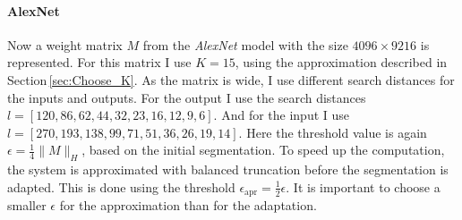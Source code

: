 \documentclass[numbers=noenddot,doctype=mastersthesis,BCOR=15mm,biblatex]{ldvbook}%
\begin{document}
\paragraph{AlexNet}
Now a weight matrix $M$ from the \emph{AlexNet} model with the size ${4096 \times 9216}$ is represented.
For this matrix I use $K=15$, using the approximation described in Section\,\ref{sec:Choose_K}.
As the matrix is wide, I use different search distances for the inputs and outputs.
For the output I use the search distances $l =  [120,  86,  62,  44,  32,  23,  16,  12,   9,   6]$.
And for the input I use $l =  [270, 193, 138,  99,  71,  51,  36,  26,  19,  14]$.
Here the threshold value is again $\epsilon = \frac{1}{4} \|M\|_H$, based on the initial segmentation.
To speed up the computation, the system is approximated with balanced truncation before the segmentation is adapted.
This is done using the threshold $\epsilon_{\text{apr}}=\frac{1}{2} \epsilon$.
It is important to choose a smaller $\epsilon$ for the approximation than for the adaptation.
\end{document}
